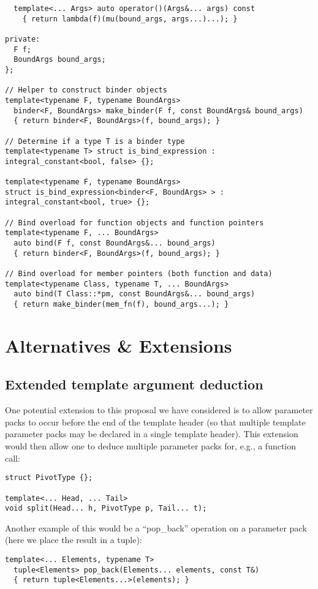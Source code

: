 \documentclass{article}
\begin{document}
\begin{verbatim}
  template<... Args> auto operator()(Args&... args) const
    { return lambda(f)(mu(bound_args, args...)...); }

private:
  F f;
  BoundArgs bound_args;
};

// Helper to construct binder objects
template<typename F, typename BoundArgs>
  binder<F, BoundArgs> make_binder(F f, const BoundArgs& bound_args)
  { return binder<F, BoundArgs>(f, bound_args); }

// Determine if a type T is a binder type
template<typename T> struct is_bind_expression : integral_constant<bool, false> {};

template<typename F, typename BoundArgs>
struct is_bind_expression<binder<F, BoundArgs> > : integral_constant<bool, true> {};

// Bind overload for function objects and function pointers
template<typename F, ... BoundArgs>
  auto bind(F f, const BoundArgs&... bound_args)
  { return binder<F, BoundArgs>(f, bound_args); }

// Bind overload for member pointers (both function and data)
template<typename Class, typename T, ... BoundArgs>
  auto bind(T Class::*pm, const BoundArgs&... bound_args)
  { return make_binder(mem_fn(f), bound_args...); }
\end{verbatim}
\normalsize

\section{Alternatives \& Extensions}
\subsection{Extended template argument deduction}
One potential extension to this proposal we have considered is to
allow parameter packs to occur before the end of the template header
(so that multiple template parameter packs may be declared in a single
template header). This extension would then allow one to deduce
multiple parameter packs for, e.g., a function call:

\begin{verbatim}
struct PivotType {};

template<... Head, ... Tail>
void split(Head... h, PivotType p, Tail... t);
\end{verbatim}

Another example of this would be a ``pop\_back'' operation on a
parameter pack (here we place the result in a tuple):

\begin{verbatim}
template<... Elements, typename T>
  tuple<Elements> pop_back(Elements... elements, const T&)
  { return tuple<Elements...>(elements); }
\end{verbatim}
\end{document}
